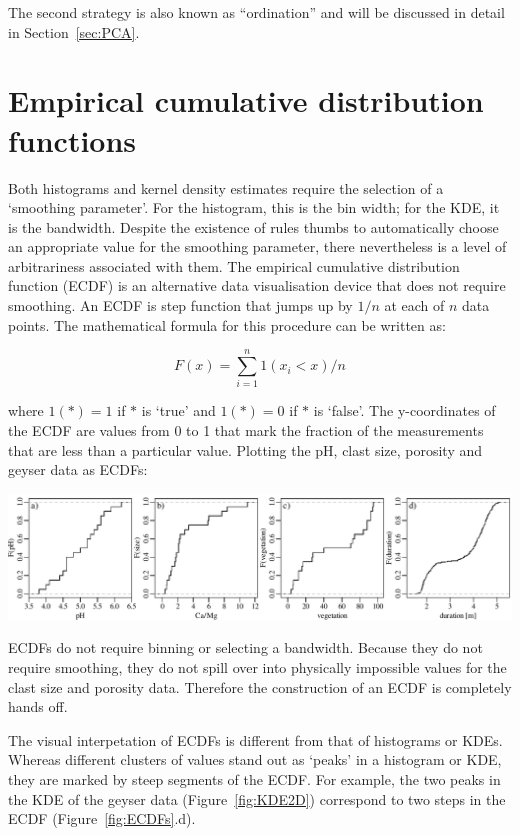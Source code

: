The second strategy is also known as ``ordination'' and will be
discussed in detail in Section~\ref{sec:PCA}.

\section{Empirical cumulative distribution functions}
\label{sec:ECDF}

Both histograms and kernel density estimates require the selection of
a `smoothing parameter'. For the histogram, this is the bin width; for
the KDE, it is the bandwidth. Despite the existence of rules thumbs to
automatically choose an appropriate value for the smoothing parameter,
there nevertheless is a level of arbitrariness associated with
them. The empirical cumulative distribution function (ECDF) is an
alternative data visualisation device that does not require
smoothing. An ECDF is step function that jumps up by $1/n$ at each of
$n$ data points.  The mathematical formula for this procedure can be
written as:
  
  \begin{equation}
    F(x) = \sum\limits_{i=1}^{n} 1(x_i<x)/n
    \label{eq:ECDF}
  \end{equation}
 
\noindent where $1(\ast) = 1$ if $\ast$ is `true' and $1(\ast) = 0$ if
$\ast$ is `false'. The y-coordinates of the ECDF are values from 0 to
1 that mark the fraction of the measurements that are less than a
particular value.  Plotting the pH, clast size, porosity and geyser
data as ECDFs:

\noindent\includegraphics[width=\textwidth]{../figures/ECDFs.pdf}
\begingroup
{}
\label{fig:ECDFs}
\endgroup

ECDFs do not require binning or selecting a bandwidth.  Because they
do not require smoothing, they do not spill over into physically
impossible values for the clast size and porosity data. Therefore the
construction of an ECDF is completely hands off.\medskip

The visual interpetation of ECDFs is different from that of histograms
or KDEs. Whereas different clusters of values stand out as `peaks' in
a histogram or KDE, they are marked by steep segments of the ECDF. For
example, the two peaks in the KDE of the geyser data
(Figure~\ref{fig:KDE2D}) correspond to two steps in the ECDF
(Figure~\ref{fig:ECDFs}.d).
